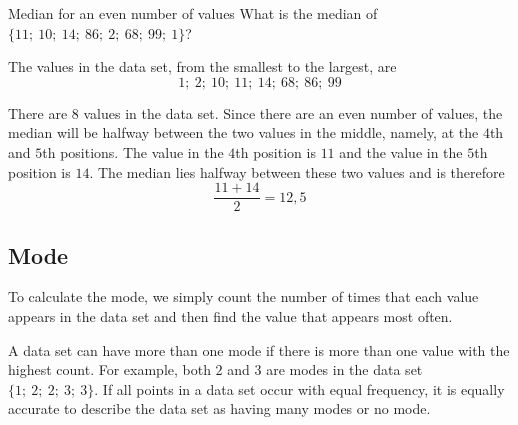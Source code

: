 \begin{wex}{Median for an even number of values}{
  What is the median of $\{11;\ 10;\ 14;\ 86;\ 2;\ 68;\ 99;\ 1\}$?
}{

  The values in the data set, from the smallest to the largest, are
  \begin{equation}
    1;\ 2;\ 10;\ 11;\ 14;\ 68;\ 86;\ 99
  \end{equation}


  There are $8$ values in the data set. Since there are an even number
  of values, the median will be halfway between the two values in the
  middle, namely, at the $4$th and $5$th positions. The value in the
  $4$th position is $11$ and the value in the $5$th position is
  $14$. The median lies halfway between these two values and is
  therefore
  \begin{equation}
    \frac{11+14}{2} = 12,5
  \end{equation}
}
\end{wex}

\subsection{Mode}

To calculate the mode, we simply count the number of times that each
value appears in the data set and then find the value that appears
most often.

A data set can have more than one mode if there is more than one value
with the highest count. For example, both $2$ and $3$ are modes in the
data set $\{1;\ 2;\ 2;\ 3;\ 3\}$. If all points in a data set occur
with equal frequency, it is equally accurate to describe the data set
as having many modes or no mode.

